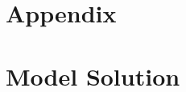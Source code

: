 \documentclass[12pt]{article}
\begin{document}

\newpage

\appendix
\section*{Appendix}
\section{Model Solution \label{sec: qualitative analysis}}
\end{document}
